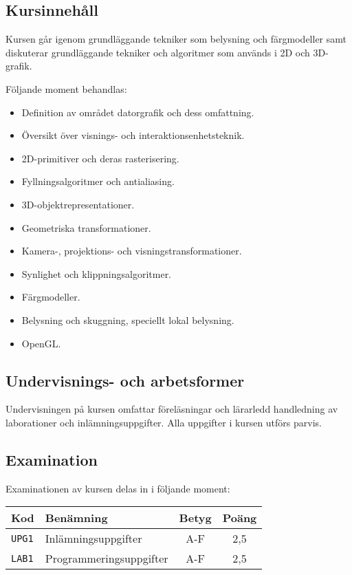\subsection*{Kursinnehåll}

Kursen går igenom grundläggande tekniker som belysning och färgmodeller
samt diskuterar grundläggande tekniker och algoritmer som används i 2D
och 3D-grafik.

Följande moment behandlas:

\begin{itemize}
\tightlist
\item
  Definition av området datorgrafik och dess omfattning.
\item
  Översikt över visnings- och interaktionsenhetsteknik.
\item
  2D-primitiver och deras rasterisering.
\item
  Fyllningsalgoritmer och antialiasing.
\item
  3D-objektrepresentationer.
\item
  Geometriska transformationer.
\item
  Kamera-, projektions- och visningstransformationer.
\item
  Synlighet och klippningsalgoritmer.
\item
  Färgmodeller.
\item
  Belysning och skuggning, speciellt lokal belysning.
\item
  OpenGL.
\end{itemize}

\subsection*{Undervisnings- och
arbetsformer}

Undervisningen på kursen omfattar föreläsningar och lärarledd
handledning av laborationer och inlämningsuppgifter. Alla uppgifter i
kursen utförs parvis.

\subsection*{Examination}

Examinationen av kursen delas in i följande moment:

\begin{longtable}[]{@{}llcc@{}}
\toprule
\textsf{Kod} & \textsf{Benämning} & \textsf{Betyg} & \textsf{Poäng}\tabularnewline
\midrule
\endhead
\texttt{UPG1} & Inlämningsuppgifter & A-F & 2,5\tabularnewline
\texttt{LAB1} & Programmeringsuppgifter & A-F & 2,5\tabularnewline
\bottomrule
\end{longtable}

